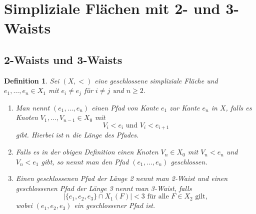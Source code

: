 \documentclass[12pt,titlepage,twoside,cleardoublepage]{article}
\theoremstyle{nummermitklammern}
\newtheorem{definition}[temp]{Definition}
\newtheorem{definition}[zahl]{Definition}
\numberwithin{equation}{section}
\begin{document}
\section{Simpliziale Flächen mit 2- und 3-Waists}
\subsection{2-Waists und 3-Waists }
\begin{definition}
Sei $(X,<)$ eine geschlossene simpliziale Fläche und $e_1,\ldots,e_n\in X_1$ mit $ e_i \neq e_j$ für $i \neq j$ und $n \geq 2$.
\begin{enumerate}
\item   Man nennt $(e_1,\ldots,e_n)$ einen \emph{Pfad von Kante $e_1$ zur Kante $e_n$ in $X$}, falls es Knoten $V_1,\ldots,V_{n-1}\in X_0$ mit 
\[
V_i<e_i \text{ und } V_i<e_{i+1}
\] 
gibt.
Hierbei ist $n$ die Länge des Pfades.
\item Falls es in der obigen Definition einen Knoten $V_n\in X_0$ mit $V_n<e_n$ und $V_n<e_1$ gibt, so nennt man den Pfad $(e_1,\ldots,e_n)$ geschlossen.
\item Einen geschlossenen Pfad der Länge 2 nennt man \emph{2-Waist} und einen geschlossenen Pfad der Länge 3 nennt man \emph{3-Waist}, falls 
\[
\vert \{e_1,e_2,e_3\}\cap X_1(F) \vert< 3\text{ für alle } F \in X_2 \text{ gilt},
\]
wobei $(e_1,e_2,e_3)$ ein geschlossener Pfad ist.\cite{SS}
\end{enumerate}
\end{definition}
\end{document}
